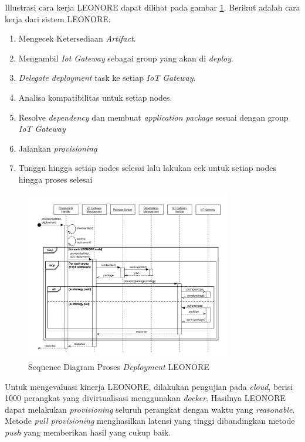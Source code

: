 Illustrasi cara kerja LEONORE dapat dilihat pada gambar \ref{fig:sequence-leonore}. Berikut adalah cara kerja dari sistem LEONORE:
\begin{enumerate}
  \item Mengecek Ketersediaan \textit{Artifact}.
  \item Mengambil \textit{Iot Gateway} sebagai group yang akan di \textit{deploy}.
  \item \textit{Delegate deployment} task ke setiap \textit{IoT Gateway}.
  \item Analisa kompatibilitas untuk setiap nodes.
  \item Resolve \textit{dependency} dan membuat \textit{application package} sesuai dengan group \textit{IoT Gateway}
  \item Jalankan \textit{provisioning}
  \item Tunggu hingga setiap nodes selesai lalu lakukan cek untuk setiap nodes hingga proses selesai
\end{enumerate}

\begin{figure}[ht]
  \centering
  \includegraphics[width=0.8\textwidth]{resources/chapter-2/leonore-sequence.jpg}
  \caption{Sequence Diagram Proses \textit{Deployment} LEONORE \parencite{vogler2015leonore}}
  \label{fig:sequence-leonore}
\end{figure}

Untuk mengevaluasi kinerja LEONORE, dilakukan pengujian pada \textit{cloud}, berisi 1000 perangkat yang divirtualisasi menggunakan \textit{docker}. Hasilnya LEONORE dapat melakukan \textit{provisioning} seluruh perangkat dengan waktu yang \textit{reasonable}. Metode \textit{pull provisioning} menghasilkan latensi yang tinggi dibandingkan metode \textit{push} yang memberikan hasil yang cukup baik.